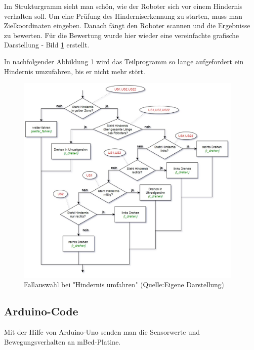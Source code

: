 Im Strukturgramm sieht man schön, wie der Roboter sich vor einem Hindernis verhalten soll. Um eine Prüfung des Hinderniserkennung zu starten, muss man Zielkoordinaten eingeben. Danach fängt den Roboter scannen und die Ergebnisse zu bewerten. Für die Bewertung wurde hier wieder eine vereinfachte grafische Darstellung - Bild \ref{baum2} erstellt.

In nachfolgender Abbildung \ref{baum2} wird das Teilprogramm so lange aufgefordert ein Hindernis umzufahren, bis er nicht mehr stört.

\begin{figure}[!h]  %
	\centering\includegraphics[width=0.99\textwidth]{images/Entsch-baum2.jpg}
	\caption{ Fallauswahl bei "Hindernis umfahren" (Quelle:Eigene Darstellung)}
	\label{baum2} %
\end{figure}
\pagebreak

\subsection{Arduino-Code}

Mit der Hilfe von Arduino-Uno senden man die Sensorwerte und Bewegungsverhalten an mBed-Platine. 


